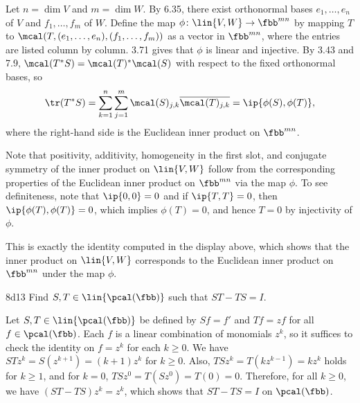 \begin{sol}
    Let $n = \dim V$ and $m = \dim W$.
    By 6.35, there exist orthonormal bases $e_1, \ldots, e_n$ of $V$ and $f_1, \ldots, f_m$ of $W$.
    Define the map $\phi \colon \lin{V, W} \to \fbb^{mn}$ by mapping $T$ to $\mcal(T, (e_1, \ldots, e_n), (f_1, \ldots, f_m))$ as a vector in $\fbb^{mn}$, where the entries are listed column by column.
    3.71 gives that $\phi$ is linear and injective.
    By 3.43 and 7.9, $\mcal(T^\ast S) = \mcal(T)^\ast \mcal(S)$ with respect to the fixed orthonormal bases, so
    \[
        \tr(T^\ast S) = \sum_{k=1}^n \sum_{j=1}^m \mcal(S)_{j, k} \overline{\mcal(T)_{j, k}} = \ip{\phi(S), \phi(T)},
    \]
    where the right-hand side is the Euclidean inner product on $\fbb^{mn}$.
    \begin{subexercises}
        \item Note that positivity, additivity, homogeneity in the first slot, and conjugate symmetry of the inner product on $\lin{V, W}$ follow from the corresponding properties of the Euclidean inner product on $\fbb^{mn}$ via the map $\phi$.
        To see definiteness, note that $\ip{0, 0} = 0$ and if $\ip{T, T} = 0$, then $\ip{\phi(T), \phi(T)} = 0$, which implies $\phi(T) = 0$, and hence $T = 0$ by injectivity of $\phi$.
        \item This is exactly the identity computed in the display above, which shows that the inner product on $\lin{V, W}$ corresponds to the Euclidean inner product on $\fbb^{mn}$ under the map $\phi$. \qedhere
    \end{subexercises}
\end{sol}

\begin{exercise}{8d13}
    Find $S, T \in \lin{\pcal(\fbb)}$ such that $ST - TS = I$.


\end{exercise}

\begin{sol}
    Let $S, T \in \lin{\pcal(\fbb)}$ be defined by $S f = f'$ and $T f = z f$ for all $f \in \pcal(\fbb)$.
    Each $f$ is a linear combination of monomials $z^k$, so it suffices to check the identity on $f = z^k$ for each $k \geq 0$.
    We have $ST z^k = S(z^{k+1}) = (k+1) z^k$ for $k \geq 0$.
    Also, $TS z^k = T(k z^{k-1}) = k z^k$ holds for $k \geq 1$, and for $k = 0$, $TS z^0 = T(S z^0) = T(0) = 0$.
    Therefore, for all $k \geq 0$, we have $(ST - TS) z^k = z^k$, which shows that $ST - TS = I$ on $\pcal(\fbb)$.
\end{sol}